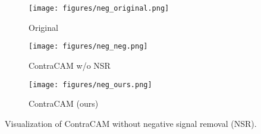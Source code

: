 \begin{figure}[h]
\centering\small
\begin{subfigure}{0.24\textwidth}
\texttt{[image: figures/neg\_original.png]}
\caption{Original}
\end{subfigure}
\begin{subfigure}{0.24\textwidth}
\texttt{[image: figures/neg\_neg.png]}
\caption{ContraCAM w/o NSR}
\end{subfigure}
\begin{subfigure}{0.24\textwidth}
\texttt{[image: figures/neg\_ours.png]}
\caption{ContraCAM (ours)}
\end{subfigure}
\caption{
Visualization of ContraCAM without negative signal removal (NSR).
}\label{fig:loc-neg}
\end{figure}
